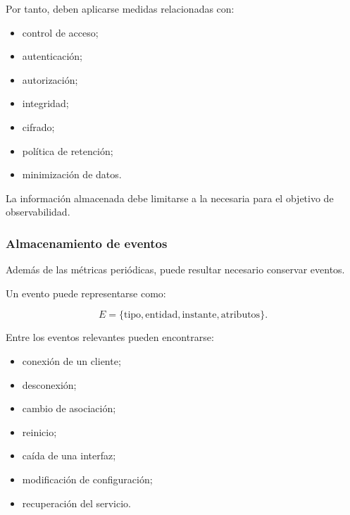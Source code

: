 Por tanto, deben aplicarse medidas relacionadas con:

\begin{itemize}
    \item control de acceso;

    \item autenticación;

    \item autorización;

    \item integridad;

    \item cifrado;

    \item política de retención;

    \item minimización de datos.
\end{itemize}

La información almacenada debe limitarse a la necesaria para el objetivo
de observabilidad.


\subsubsection*{Almacenamiento de eventos}

Además de las métricas periódicas, puede resultar necesario conservar
eventos.

Un evento puede representarse como:

\[
    E
    =
    \{
        \text{tipo},
        \text{entidad},
        \text{instante},
        \text{atributos}
    \}.
\]

Entre los eventos relevantes pueden encontrarse:

\begin{itemize}
    \item conexión de un cliente;

    \item desconexión;

    \item cambio de asociación;

    \item reinicio;

    \item caída de una interfaz;

    \item modificación de configuración;

    \item recuperación del servicio.
\end{itemize}

